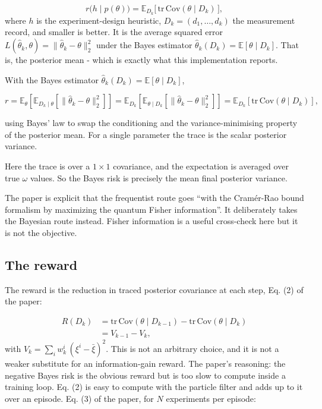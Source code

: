 \documentclass[12pt,a4paper]{article}
\begin{document}
\begin{equation}
r\bigl(h \mid p(\theta)\bigr) = \mathbb{E}_{D_k}\bigl[\, \mathrm{tr}\,\mathrm{Cov}(\theta \mid D_k)
\,\bigr],
\label{eq:bayes-risk}
\end{equation}
where $h$ is the experiment-design heuristic, $D_k = (d_1,\dots,d_k)$ the measurement record, and
smaller is better. It is the average squared error $L(\hat\theta_k, \theta) =
\lVert\hat\theta_k - \theta\rVert_2^2$ under the Bayes estimator $\hat\theta_k(D_k) =
\mathbb{E}[\theta \mid D_k]$. That is, the posterior mean - which is exactly what this
implementation reports.

With the Bayes estimator $\hat\theta_k(D_k) = \mathbb{E}[\theta \mid D_k]$,

\begin{equation}
r = \mathbb{E}_{\theta}\!\left[\mathbb{E}_{D_k\mid\theta}\!\left[\lVert \hat\theta_k -
\theta \rVert_2^2\right]\right]
  = \mathbb{E}_{D_k}\!\left[\mathbb{E}_{\theta\mid D_k}\!\left[\lVert \hat\theta_k -
\theta \rVert_2^2\right]\right]
  = \mathbb{E}_{D_k}\!\left[\mathrm{tr}\,\mathrm{Cov}(\theta \mid D_k)\right],
\end{equation}

using Bayes' law to swap the conditioning and the variance-minimising property of the posterior
mean. For a single parameter the trace is the scalar posterior variance.

Here the trace is over a $1\times1$ covariance, and the expectation is averaged over true $\omega$
values. So the Bayes risk is precisely the mean final posterior variance.

The paper is explicit that the frequentist route goes ``with the Cram\'er-Rao bound formalism
by maximizing the quantum Fisher information''. It
deliberately takes the Bayesian route instead. Fisher information is a useful cross-check here
 but it is not the objective.

\subsection{The reward}
\label{sec:the-reward}
The reward is the reduction in traced posterior covariance at each step, Eq. (2) of the paper:

\begin{align}
R(D_k) &= \mathrm{tr}\,\mathrm{Cov}(\theta \mid D_{k-1}) - \mathrm{tr}\,\mathrm{Cov}(\theta \mid
D_k) \nonumber \\
       &= V_{k-1} - V_k,
\label{eq:reward}
\end{align}
with $V_k = \sum_i w_k^i\,(\xi^i - \bar{\xi})^2$. This is not an arbitrary choice, and it is not a
weaker substitute for an information-gain reward. The paper's reasoning: the negative Bayes risk is
the obvious reward but is too slow to compute inside a training loop. Eq. (2) is easy to compute with the
particle filter and adds up to it over an episode. Eq. (3) of the paper, for $N$ experiments per episode:
\end{document}
